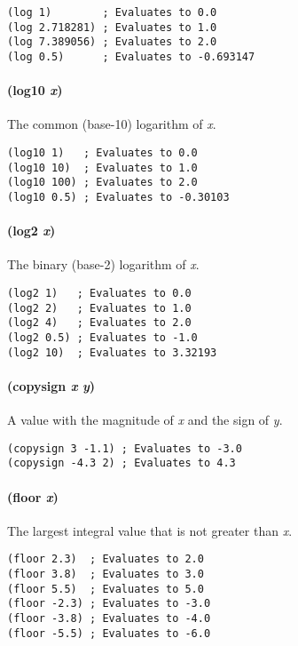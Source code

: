 \documentclass[twoside=false, numbers=noenddot]{scrbook}
\begin{document}
\begin{verbatim}
(log 1)        ; Evaluates to 0.0
(log 2.718281) ; Evaluates to 1.0
(log 7.389056) ; Evaluates to 2.0
(log 0.5)      ; Evaluates to -0.693147
\end{verbatim}

\paragraph{(log10 \emph{x})}
The common (base-10) logarithm of \emph{x}.

\begin{verbatim}
(log10 1)   ; Evaluates to 0.0
(log10 10)  ; Evaluates to 1.0
(log10 100) ; Evaluates to 2.0
(log10 0.5) ; Evaluates to -0.30103
\end{verbatim}

\paragraph{(log2 \emph{x})}
The binary (base-2) logarithm of \emph{x}.

\begin{verbatim}
(log2 1)   ; Evaluates to 0.0
(log2 2)   ; Evaluates to 1.0
(log2 4)   ; Evaluates to 2.0
(log2 0.5) ; Evaluates to -1.0
(log2 10)  ; Evaluates to 3.32193
\end{verbatim}

\paragraph{(copysign \emph{x} \emph{y})}
A value with the magnitude of \emph{x} and the sign of \emph{y}.

\begin{verbatim}
(copysign 3 -1.1) ; Evaluates to -3.0
(copysign -4.3 2) ; Evaluates to 4.3
\end{verbatim}

\paragraph{(floor \emph{x})}
The largest integral value that is not greater than \emph{x}.

\begin{verbatim}
(floor 2.3)  ; Evaluates to 2.0
(floor 3.8)  ; Evaluates to 3.0
(floor 5.5)  ; Evaluates to 5.0
(floor -2.3) ; Evaluates to -3.0
(floor -3.8) ; Evaluates to -4.0
(floor -5.5) ; Evaluates to -6.0
\end{verbatim}
\end{document}
